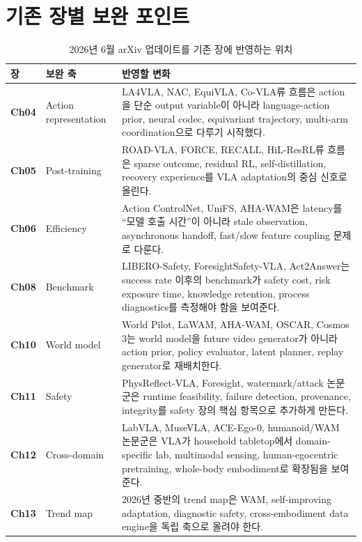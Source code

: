 \section{기존 장별 보완 포인트}

\begin{table}[t]
  \centering
  \small
  \caption{2026년 6월 arXiv 업데이트를 기존 장에 반영하는 위치}
  \label{tab:june2026_chapter_patch_map}
  \begin{tabularx}{\textwidth}{>{\bfseries}p{20mm}p{36mm}X}
    \toprule
    장 & 보완 축 & 반영할 변화 \\
    \midrule
    Ch04 & Action representation & LA4VLA, NAC, EquiVLA, Co-VLA류 흐름은 action을 단순 output variable이 아니라 language-action prior, neural codec, equivariant trajectory, multi-arm coordination으로 다루기 시작했다. \\
    Ch05 & Post-training & ROAD-VLA, FORCE, RECALL, HiL-ResRL류 흐름은 sparse outcome, residual RL, self-distillation, recovery experience를 VLA adaptation의 중심 신호로 올린다. \\
    Ch06 & Efficiency & Action ControlNet, UniFS, AHA-WAM은 latency를 ``모델 호출 시간''이 아니라 stale observation, asynchronous handoff, fast/slow feature coupling 문제로 다룬다. \\
    Ch08 & Benchmark & LIBERO-Safety, ForesightSafety-VLA, Act2Answer는 success rate 이후의 benchmark가 safety cost, risk exposure time, knowledge retention, process diagnostics를 측정해야 함을 보여준다. \\
    Ch10 & World model & World Pilot, LaWAM, AHA-WAM, OSCAR, Cosmos 3는 world model을 future video generator가 아니라 action prior, policy evaluator, latent planner, replay generator로 재배치한다. \\
    Ch11 & Safety & PhysReflect-VLA, Foresight, watermark/attack 논문군은 runtime feasibility, failure detection, provenance, integrity를 safety 장의 핵심 항목으로 추가하게 만든다. \\
    Ch12 & Cross-domain & LabVLA, MuseVLA, ACE-Ego-0, humanoid/WAM 논문군은 VLA가 household tabletop에서 domain-specific lab, multimodal sensing, human-egocentric pretraining, whole-body embodiment로 확장됨을 보여준다. \\
    Ch13 & Trend map & 2026년 중반의 trend map은 WAM, self-improving adaptation, diagnostic safety, cross-embodiment data engine을 독립 축으로 올려야 한다. \\
    \bottomrule
  \end{tabularx}
\end{table}

